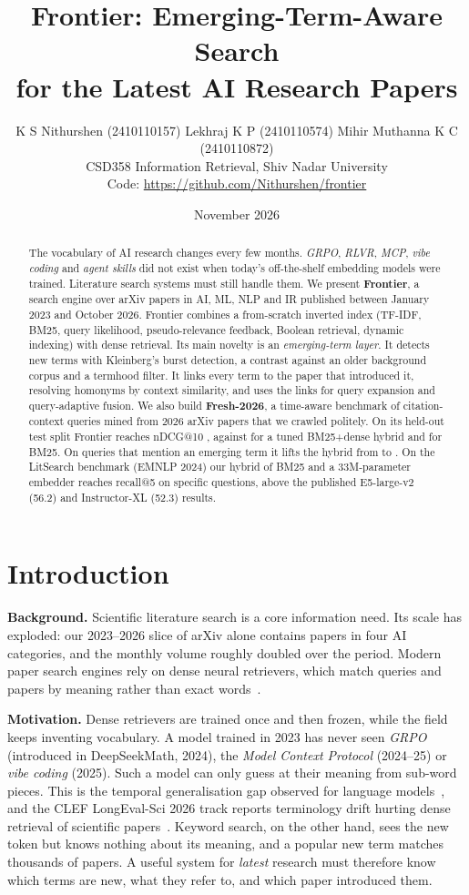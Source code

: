 \documentclass[10pt,twocolumn]{article}
\title{\textbf{Frontier: Emerging-Term-Aware Search\\for the Latest AI Research Papers}}
\author{K S Nithurshen (2410110157) \quad Lekhraj K P (2410110574) \quad Mihir Muthanna K C (2410110872)\\
\small CSD358 Information Retrieval, Shiv Nadar University\\
\small Code: \url{https://github.com/Nithurshen/frontier}}
\date{November 2026}
\begin{document}
\maketitle

\begin{abstract}
The vocabulary of AI research changes every few months. \emph{GRPO}, \emph{RLVR},
\emph{MCP}, \emph{vibe coding} and \emph{agent skills} did not exist when today's
off-the-shelf embedding models were trained. Literature search systems must still
handle them. We present \textbf{Frontier}, a search engine over \NDocs{} arXiv papers
in AI, ML, NLP and IR published between January 2023 and October 2026. Frontier
combines a from-scratch inverted index (TF-IDF, BM25, query likelihood, pseudo-relevance
feedback, Boolean retrieval, dynamic indexing) with dense retrieval. Its main novelty
is an \emph{emerging-term layer}. It detects new terms with Kleinberg's burst
detection, a contrast against an older background corpus and a termhood filter. It
links every term to the paper that introduced it, resolving homonyms by context
similarity, and uses the links for query expansion and query-adaptive fusion. We also
build \textbf{Fresh-2026}, a time-aware benchmark of \NFresh{} citation-context
queries mined from 2026 arXiv papers that we crawled politely. On its held-out test
split Frontier reaches nDCG@10 \FrontierNdcg{}, against \HybridNdcg{} for a tuned
BM25+dense hybrid and \BmNdcg{} for BM25. On queries that mention an emerging term
it lifts the hybrid from \TermHybrid{} to \TermFrontier{}. On the LitSearch benchmark
(EMNLP 2024) our hybrid of BM25 and a 33M-parameter embedder reaches recall@5
\LitHybrid{} on specific questions, above the published E5-large-v2 (56.2) and
Instructor-XL (52.3) results.
\end{abstract}

\section{Introduction}
\textbf{Background.} Scientific literature search is a core information need. Its
scale has exploded: our 2023--2026 slice of arXiv alone contains \NDocs{} papers in
four AI categories, and the monthly volume roughly doubled over the period. Modern
paper search engines rely on dense neural retrievers, which match queries and
papers by meaning rather than exact words~\cite{ajith2024,cohan2020}.

\textbf{Motivation.} Dense retrievers are trained once and then frozen, while the
field keeps inventing vocabulary. A model trained in 2023 has never seen
\emph{GRPO} (introduced in DeepSeekMath, 2024), the \emph{Model Context Protocol}
(2024--25) or \emph{vibe coding} (2025). Such a model can only guess at their meaning
from sub-word pieces. This is the temporal generalisation gap observed for language
models~\cite{lazaridou2021}, and the CLEF LongEval-Sci 2026 track reports terminology
drift hurting dense retrieval of scientific papers~\cite{longeval2026}. Keyword
search, on the other hand, sees the new token but knows nothing about its meaning,
and a popular new term matches thousands of papers. A useful system for
\emph{latest} research must therefore know which terms are new, what they refer to,
and which paper introduced them.
\end{document}
